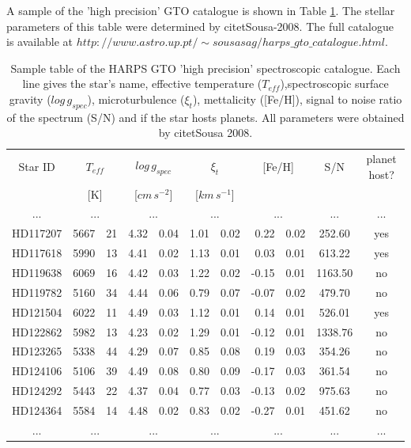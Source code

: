 \documentclass[dvips,12pt,a4paper]{report}
\begin{document}
{A sample of the 'high precision' GTO catalogue is shown in Table \ref{cat_sample}. The stellar parameters of this table were determined by citet{Sousa-2008}. The full catalogue is available at $http://www.astro.up.pt/\sim sousasag/harps\_gto\_catalogue.html$. 

\begin{table}[h]
  \centering
\caption[Sample table of the HARPS GTO ``high precision'' spectroscopic catalogue.]{Sample table of the HARPS GTO 'high precision' spectroscopic catalogue. Each line gives the star's name, effective temperature ($T_{eff}$),spectroscopic surface gravity ($log\,g_{spec}$), microturbulence ($\xi_t$), mettalicity ([Fe/H]), signal to noise ratio of the spectrum (S/N) and if the star hosts planets. All parameters were obtained by citetSousa 2008.}
  \label{cat_sample}
  \begin{tabular}{ c r@{$\pm$}l r@{$\pm$}l r@{$\pm$}l r@{$\pm$}l c c}
  \hline
  \hline
Star ID & \multicolumn {2}{c}{$T_{eff}$} & \multicolumn {2}{c}{$log\,g_{spec}$} & \multicolumn {2}{c}{$\xi_t$} & \multicolumn {2}{c}{[Fe/H]} & S/N & planet host? \\ 
& \multicolumn {2}{c}{[K]} & \multicolumn {2}{c}{[$cm\,s^{-2}$]} & \multicolumn {2}{c}{[$km\,s^{-1}$]} & \multicolumn {2}{c}{ } &  &  \\
\hline
... & \multicolumn {2}{c}{...} & \multicolumn {2}{c}{...} & \multicolumn {2}{c}{...} & \multicolumn {2}{c}{...} & ... & ... \\
HD117207 & 5667 & 21 & 4.32 & 0.04 & 1.01 & 0.02 & 0.22 & 0.02 & 252.60 & yes \\
HD117618 & 5990 & 13 & 4.41 & 0.02 & 1.13 & 0.01 & 0.03 & 0.01 & 613.22 & yes \\
HD119638 & 6069 & 16 & 4.42 & 0.03 & 1.22 & 0.02 & -0.15 & 0.01 & 1163.50 & no \\
HD119782 & 5160 & 34 & 4.44 & 0.06 & 0.79 & 0.07 & -0.07 & 0.02 & 479.70 & no \\
HD121504 & 6022 & 11 & 4.49 & 0.03 & 1.12 & 0.01 & 0.14 & 0.01 & 526.01 & yes \\
HD122862 & 5982 & 13 & 4.23 & 0.02 & 1.29 & 0.01 & -0.12 & 0.01 & 1338.76 & no \\
HD123265 & 5338 & 44 & 4.29 & 0.07 & 0.85 & 0.08 & 0.19 & 0.03 & 354.26 & no \\
HD124106 & 5106 & 39 & 4.49 & 0.08 & 0.80 & 0.09 & -0.17 & 0.03 & 361.54 & no \\
HD124292 & 5443 & 22 & 4.37 & 0.04 & 0.77 & 0.03 & -0.13 & 0.02 & 975.63 & no \\
HD124364 & 5584 & 14 & 4.48 & 0.02 & 0.83 & 0.02 & -0.27 & 0.01 & 451.62 & no \\
... & \multicolumn {2}{c}{...} & \multicolumn {2}{c}{...} & \multicolumn {2}{c}{...} & \multicolumn {2}{c}{...} & ... & ... \\
\hline
\end{tabular}
\end{table}





}
\end{document}
